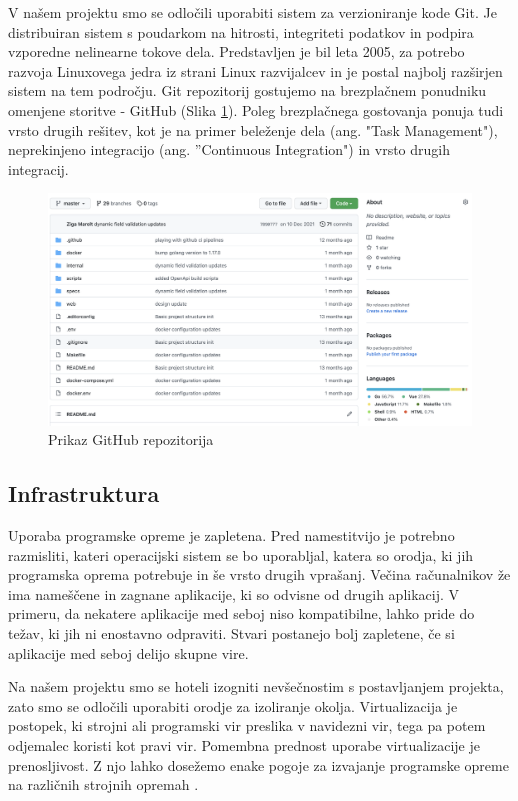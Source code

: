 \documentclass[a4paper, 12pt]{book}
\begin{document}
V našem projektu smo se odločili uporabiti sistem za verzioniranje kode Git. Je distribuiran sistem s poudarkom na hitrosti, integriteti podatkov in podpira vzporedne nelinearne tokove dela. Predstavljen je bil leta 2005, za potrebo razvoja Linuxovega jedra iz strani Linux razvijalcev \cite{git-history} in je postal najbolj razširjen sistem na tem področju. Git repozitorij gostujemo na brezplačnem ponudniku omenjene storitve - GitHub (Slika \ref{github-project}). Poleg brezplačnega gostovanja ponuja tudi vrsto drugih rešitev, kot je na primer beleženje dela (ang. "Task Management"), neprekinjeno integracijo (ang. ''Continuous Integration") in vrsto drugih integracij.

\begin{figure}[h]
\begin{center}
\includegraphics[width=1\textwidth]{slike/github.png}
\end{center}
\caption{ Prikaz GitHub repozitorija }
\label{github-project}
\end{figure}

\subsection{Infrastruktura}
Uporaba programske opreme je zapletena. Pred namestitvijo je potrebno razmisliti, kateri operacijski sistem se bo uporabljal, katera so orodja, ki jih programska oprema potrebuje in še vrsto drugih vprašanj. Večina računalnikov že ima nameščene in zagnane aplikacije, ki so odvisne od drugih aplikacij. V primeru, da nekatere aplikacije med seboj niso kompatibilne, lahko pride do težav, ki jih ni enostavno odpraviti. Stvari postanejo bolj zapletene, če si aplikacije med seboj delijo skupne vire. 

Na našem projektu smo se hoteli izogniti nevšečnostim s postavljanjem projekta, zato smo se odločili uporabiti orodje za izoliranje okolja. Virtualizacija je postopek, ki strojni ali programski vir preslika v navidezni vir, tega pa potem odjemalec koristi kot pravi vir. Pomembna prednost uporabe virtualizacije je prenosljivost. Z njo lahko dosežemo enake pogoje za izvajanje programske opreme na različnih strojnih opremah \cite{docker-in-action}.
\end{document}
